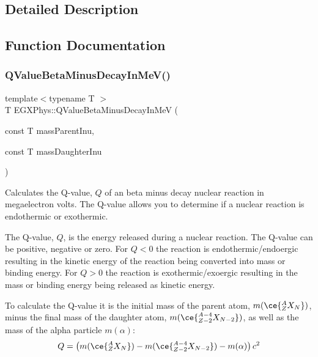 \subsection{Detailed Description}


\subsection{Function Documentation}
\mbox{\label{group___e_g_x_phys-_q_value-_beta_minus_gaac1374ce9ba39bef416f34298708bda9}} 
\subsubsection{\texorpdfstring{Q\+Value\+Beta\+Minus\+Decay\+In\+Me\+V()}{QValueBetaMinusDecayInMeV()}}
{\footnotesize\ttfamily template$<$typename T $>$ \\
T E\+G\+X\+Phys\+::\+Q\+Value\+Beta\+Minus\+Decay\+In\+MeV (\begin{DoxyParamCaption}\item[{const T}]{mass\+Parent\+Inu,  }\item[{const T}]{mass\+Daughter\+Inu }\end{DoxyParamCaption})}



Calculates the Q-\/value, $Q$ of an beta minus decay nuclear reaction in megaelectron volts. The Q-\/value allows you to determine if a nuclear reaction is endothermic or exothermic. 

The Q-\/value, $Q$, is the energy released during a nuclear reaction. The Q-\/value can be positive, negative or zero. For $Q < 0$ the reaction is endothermic/endoergic resulting in the kinetic energy of the reaction being converted into mass or binding energy. For $Q > 0$ the reaction is exothermic/exoergic resulting in the mass or binding energy being released as kinetic energy.

To calculate the Q-\/value it is the initial mass of the parent atom, $m(\ce{ ^{A}_{Z}X_{N} })$, minus the final mass of the daughter atom, $m(\ce{ ^{A-4}_{Z-2}X_{N-2} })$, as well as the mass of the alpha particle $m(\alpha)$\+: \[Q = \left ( m(\ce{ ^{A}_{Z}X_{N} })-m(\ce{ ^{A-4}_{Z-2}X_{N-2} })-m(\alpha) \right) c^2\]


